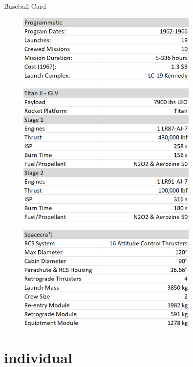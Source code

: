 \documentclass[10pt]{beamer}
\begin{document}
\begin{frame}{Baseball Card}
\begin{minipage}{0.48\textwidth}
	\end{minipage}%
\begin{minipage}{0.49\textwidth}
	\begin{figure}
		\centering
		\includegraphics[width=0.8\textwidth]{baseball.png}
	\end{figure}
	
\end{minipage}

\end{frame}

\section{individual}
\end{document}
